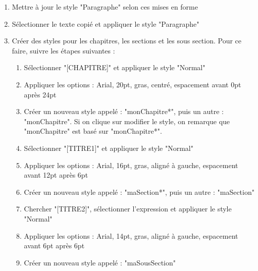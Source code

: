 \documentclass[11pt, a4paper]{article}
\begin{document}
\begin{enumerate}
	\item Mettre à jour le style "Paragraphe" selon ces mises en forme
	\item Sélectionner le texte copié et appliquer le style "Paragraphe"  
	\item Créer des styles pour les chapitres, les sections et les sous section. Pour ce faire, suivre les étapes suivantes : 
	\begin{multicols}{2}
	\begin{enumerate}
		\item Sélectionner "[CHAPITRE]" et appliquer le style "Normal" 
		\item Appliquer les options : Arial, 20pt, gras, centré, espacement avant 0pt après 24pt
		\item Créer un nouveau style appelé : "monChapitre*", puis un autre : "monChapitre". Si on clique sur modifier le style, on remarque que "monChapitre" est basé sur "monChapitre*".
		\item Sélectionner "[TITRE1]" et appliquer le style "Normal" 
		\item Appliquer les options : Arial, 16pt, gras, aligné à gauche, espacement avant 12pt après 6pt
		\item Créer un nouveau style appelé : "maSection*", puis un autre : "maSection"
		\item Chercher "[TITRE2]", sélectionner l'expression et appliquer le style "Normal"
		\item Appliquer les options : Arial, 14pt, gras, aligné à gauche, espacement avant 6pt après 6pt
		\item Créer un nouveau style appelé : "maSousSection"
	\end{enumerate}
	\end{multicols}
	

\end{enumerate}
\end{document}
